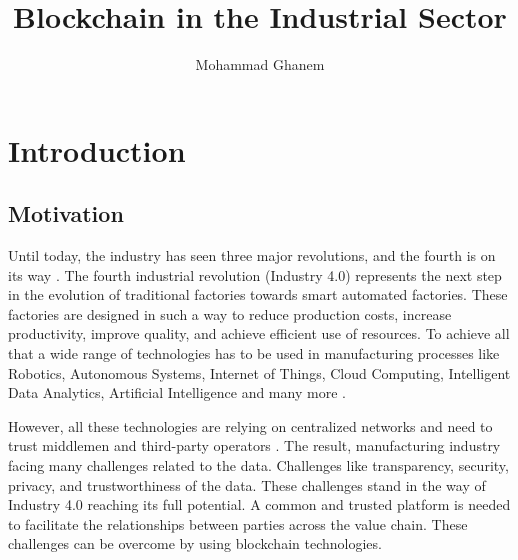 \documentclass[runningheads]{llncs}
\begin{document}
\title{Blockchain in the Industrial Sector}
\author{Mohammad Ghanem}
\maketitle

\let\labelitemi\labelitemii

\section{Introduction}

\subsection{Motivation}
Until today, the industry has seen three major revolutions, and the fourth is on its way \cite{Rojko2017}. The fourth industrial revolution (Industry 4.0) represents the next step in the evolution of traditional factories towards smart automated factories. These factories are designed in such a way to reduce production costs, increase productivity, improve quality, and achieve efficient use of resources. To achieve all that a wide range of technologies has to be used in manufacturing processes like Robotics, Autonomous Systems, Internet of Things, Cloud Computing, Intelligent Data Analytics, Artificial Intelligence and many more \cite{Fernandez-carames2018}.

\bigbreak

\noindent However, all these technologies are relying on centralized networks and need to trust middlemen and third-party operators \cite{Angrish2018a,Sikorski2017,Li2018,Afanasev2018,Garrocho2019}. The result, manufacturing industry facing many challenges related to the data. Challenges like transparency, security, privacy, and trustworthiness of the data. These challenges stand in the way of Industry 4.0 reaching its full potential. A common and trusted platform is needed to facilitate the relationships between parties across the value chain. These challenges can be overcome by using blockchain technologies.

\bigbreak
\end{document}
